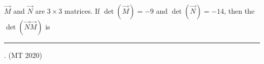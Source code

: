 \item $\vec{M}$ and $\vec{N}$ are $3 \times 3$ matrices. If $\det(\vec{M}) = -9$ and $\det(\vec{N}) = -14$, then the $\det(\vec{N}\vec{M})$ is  \rule{1cm}{0.01pt}.  
\hfill(MT 2020)

